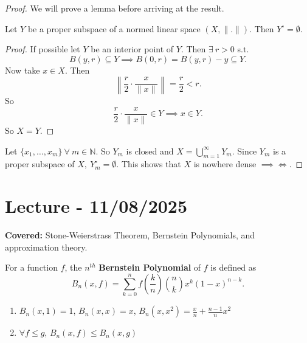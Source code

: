 \documentclass{functionspaces}
\begin{document}
\begin{proof}
We will prove a lemma before arriving at the result.

\begin{lemma}
Let $Y$ be a proper subspace of a normed linear space $(X,\|.\|)$. Then $Y^{\circ}=\emptyset$.
\end{lemma}

\begin{proof}
If possible let $Y$ be an interior point of $Y$. Then $\exists\ r>0$ s.t.
\[
B(y,r)\subseteq Y\implies B(0,r)=B(y,r)-y\subseteq Y.
\]
Now take $x\in X$. Then
\[
\left\|\frac{r}{2}\cdot\frac{x}{\|x\|}\right\|=\frac{r}{2}<r.
\]
So
\[
\frac{r}{2}\cdot\frac{x}{\|x\|}\in Y\implies x\in Y.
\]
So $X=Y$.
\end{proof}

Let $\{x_{1},\ldots,x_{m}\}\ \forall\ m\in\mathbb{N}$. So $Y_{m}$ is closed and $X=\bigcup_{m=1}^{\infty}Y_{m}$. Since $Y_{m}$ is a proper subspace of $X,\ Y_{m}^{\circ}=\emptyset$. This shows that $X$ is nowhere dense $\implies\iff$.
\end{proof}

\endgroup


\newpage
\section{Lecture - 11/08/2025}

\textbf{Covered:} Stone-Weierstrass Theorem, Bernstein Polynomials, and approximation theory.

\begingroup
\setlength{\parskip}{6pt}
\setlength{\parindent}{0pt}

\begin{definition}
For a function $f$, the $n^{th}$ \textbf{Bernstein Polynomial} of $f$ is defined as
\[
B_{n}(x,f) = \sum_{k=0}^{n}f\left(\frac{k}{n}\right)\binom{n}{k}x^{k}(1-x)^{n-k}.
\]
\end{definition}

\begin{lemma}
\begin{enumerate}
\item $B_{n}(x,1) = 1$, $B_{n}(x,x) = x$, $B_{n}(x,x^{2}) = \frac{x}{n} + \frac{n-1}{n}x^{2}$
\item $\forall f \leq g$, $B_{n}(x,f) \leq B_{n}(x,g)$
\end{enumerate}
\end{lemma}
\end{document}
